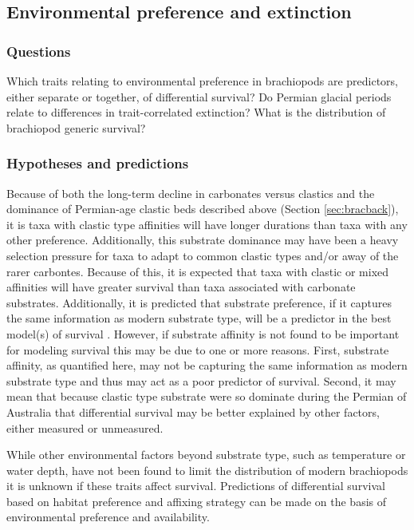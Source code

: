 \documentclass[12pt,letterpaper]{article}
\begin{document}
\subsection{Environmental preference and extinction} \label{sec:bracsurv}
\subsubsection{Questions} \label{sec:bracsurvques}
Which traits relating to environmental preference in brachiopods are predictors, either separate or together, of differential survival? Do Permian glacial periods relate to differences in trait-correlated extinction? What is the distribution of brachiopod generic survival?

\subsubsection{Hypotheses and predictions} \label{sec:bracsurvpred}
Because of both the long-term decline in carbonates versus clastics \citep{Peters2008} and the dominance of Permian-age clastic beds \citep{Birgenheier2010,Percival2012,Thomas2007,Fielding2008a,Fielding2008} described above (Section \ref{sec:bracback}), it is taxa with clastic type affinities will have longer durations than taxa with any other preference. Additionally, this substrate dominance may have been a heavy selection pressure for taxa to adapt to common clastic types and/or away of the rarer carbontes.
Because of this, it is expected that taxa with clastic or mixed affinities will have greater survival than taxa associated with carbonate substrates. Additionally, it is predicted that substrate preference, if it captures the same information as modern substrate type, will be a predictor in the best model(s) of survival \citep{Richardson1997,Richardson1997a}. However, if substrate affinity is not found to be important for modeling survival this may be due to one or more reasons. First, substrate affinity, as quantified here, may not be capturing the same information as modern substrate type and thus may act as a poor predictor of survival. Second, it may mean that because clastic type substrate were so dominate during the Permian of Australia that differential survival may be better explained by other factors, either measured or unmeasured. 

While other environmental factors beyond substrate type, such as temperature or water depth, have not been found to limit the distribution of modern brachiopods \citep{Richardson1997,Richardson1997a} it is unknown if these traits affect survival. Predictions of differential survival based on habitat preference and affixing strategy can be made on the basis of environmental preference and availability.
\end{document}
